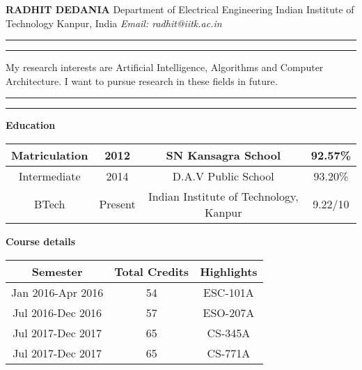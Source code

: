 \documentclass{article}
\begin{document}
\noindent
 \hspace*{5pt}\textbf{RADHIT DEDANIA}
\newline
 \hspace*{2.5pt} Department of Electrical Engineering
\newline
\hspace*{6pt}Indian Institute of Technology Kanpur, India
\newline
\hspace*{5pt}\textit{Email: radhit@iitk.ac.in}
\vspace{10pt}

\hrule

\vspace{2.5pt}
\hrule
\vspace{5pt}
\noindent My research interests are Artificial Intelligence, Algorithms and Computer Architecture. I want to pursue research in these fields in future.
\vspace{5pt}

\hrule
\vspace{2.5pt}
\hrule
\vspace{5pt} \noindent
 \hspace{5pt} \textbf{Education}
\newline \noindent 

\noindent \vspace*{10pt} \begin{left}
  \begin{tabular}{| c | c | c | c |} 
 \hline
 Matriculation & 2012 & SN Kansagra School & 92.57\%  \\ [0.5ex] 
 \hline
 Intermediate & 2014 & D.A.V Public School & 93.20\% \\ 
 \hline
 BTech & Present & Indian Institute of Technology, Kanpur & 9.22/10  \\
 \hline

\end{tabular}
\end{left}\noindent

\vspace*{5pt} \noindent
\hspace*{5pt} \textbf{Course details}
\newline \noindent 

\noindent \vspace*{10pt} \begin{left}
  \begin{tabular}{| c | c | c |} 
 \hline
  \textbf{Semester} & \textbf{Total Credits} & \textbf{Highlights}  \\ [0.5ex] 
 \hline
 Jan 2016-Apr 2016 & 54 & ESC-101A  \\ [0.5ex] 
 \hline
 Jul 2016-Dec 2016 & 57 & ESO-207A \\ [0.5ex]
 \hline
 Jul 2017-Dec 2017 & 65 & CS-345A\\  [0.5ex]
 \hline
 Jul 2017-Dec 2017 & 65 & CS-771A \\ [0.5ex] 
 \hline


\end{tabular}
\end{left}\noindent 
\end{document}
